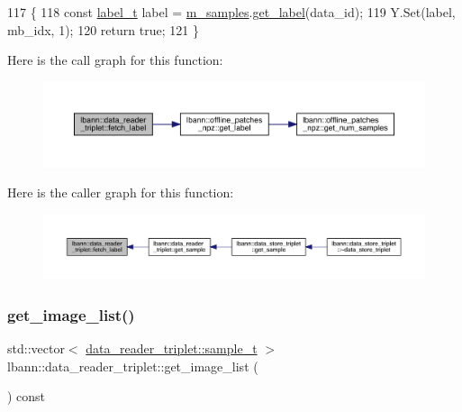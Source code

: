 \begin{DoxyCode}
117                                                                               \{
118   \textcolor{keyword}{const} \hyperlink{classlbann_1_1data__reader__triplet_a7b18fbd40987c99e1c839efc12567fb7}{label\_t} label = \hyperlink{classlbann_1_1data__reader__triplet_a1f414c6d80f6e48fc91f98db0531f1f8}{m\_samples}.\hyperlink{classlbann_1_1offline__patches__npz_a7548019f8e7f768027b50d497c4e6e73}{get\_label}(data\_id);
119   Y.Set(label, mb\_idx, 1);
120   \textcolor{keywordflow}{return} \textcolor{keyword}{true};
121 \}
\end{DoxyCode}
Here is the call graph for this function\+:\nopagebreak
\begin{figure}[H]
\begin{center}
\leavevmode
\includegraphics[width=350pt]{classlbann_1_1data__reader__triplet_a69dc790a54edde4d123fd7e62df6e5b8_cgraph}
\end{center}
\end{figure}
Here is the caller graph for this function\+:\nopagebreak
\begin{figure}[H]
\begin{center}
\leavevmode
\includegraphics[width=350pt]{classlbann_1_1data__reader__triplet_a69dc790a54edde4d123fd7e62df6e5b8_icgraph}
\end{center}
\end{figure}
\mbox{\label{classlbann_1_1data__reader__triplet_a41a1506e4a77e610fd8db5a618e3e576}} 
\subsubsection{\texorpdfstring{get\+\_\+image\+\_\+list()}{get\_image\_list()}}
{\footnotesize\ttfamily std\+::vector$<$ \hyperlink{classlbann_1_1data__reader__triplet_adddc55e0424d38b60ac5f55c16990bb7}{data\+\_\+reader\+\_\+triplet\+::sample\+\_\+t} $>$ lbann\+::data\+\_\+reader\+\_\+triplet\+::get\+\_\+image\+\_\+list (\begin{DoxyParamCaption}{ }\end{DoxyParamCaption}) const}



